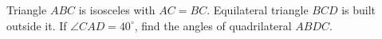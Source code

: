 Triangle $ABC$ is isosceles with $AC=BC$. Equilateral triangle $BCD$ is built outside it. If $\angle CAD=40^\circ$, find the angles of quadrilateral $ABDC$.
